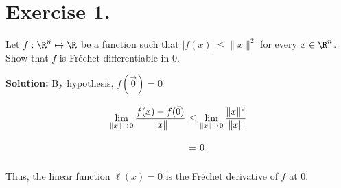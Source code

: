 \section*{Exercise 1.}

Let $f:\R^n \mapsto \R$ be a function such that $|f(x)| \leq \|x\|^2$ for every $x\in\R^n$. Show that $f$ is Fréchet differentiable in $0$.

\textbf{Solution:}
By hypothesis, $f(\vec{0}) = 0$
\[ \everymath{\displaystyle}
\arraycolsep=1.8pt\def\arraystretch{2.5}
\begin{array}{rcl}
    \lim_{\|x\|\to 0}\frac{f(x)-f(\vec{0})}{\|x\|}
    & \leq & \lim_{\|x\|\to 0}\frac{\|x\|^2}{\|x\|}\\
    & = & 0.
\end{array} \]

Thus, the linear function $\ell(x) = 0$ is the Fréchet derivative of $f$ at 0. 